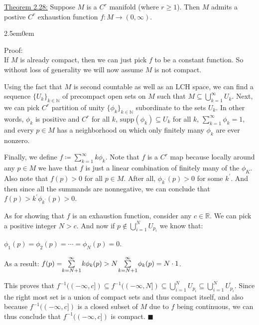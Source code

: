 \documentclass{book}
\newcommand{\exTwo}{%
   \color{Purple}%
   \fontsize{13}{15}\selectfont%
}
\newcommand{\exThreeP}{%
   \color{RedViolet}%
   \fontsize{12}{14}\selectfont%
}
\newenvironment{myIndent}{%
   \begin{adjustwidth}{2.5em}{0em}%
}{%
   \end{adjustwidth}%
}
\newcommand{\supp}{\mathrm{supp}}
\newcommand{\retTwo}{\hfill\bigbreak}
\begin{document}
\exTwo\ul{Theorem 2.28:} Suppose $M$ is a $C^r$ manifold (where $r \geq 1$). Then $M$ admits a postive $C^r$ exhaustion function $f: M \to (0, \infty)$.
\begin{myIndent}\exThreeP
	Proof:\\
	If $M$ is already compact, then we can just pick $f$ to be a constant function. So without loss of generality we will now assume $M$ is not compact.\newpage

	Using the fact that $M$ is second countable as well as an LCH space, we can find a sequence $\{U_k\}_{k \in \mathbb{N}}$ of precompact open sets on $M$ such that $M \subseteq \bigcup_{k=1}^\infty U_k$. Next, we can pick $C^r$ partition of unity $\{\phi_k\}_{k \in \mathbb{N}}$ subordinate to the sets $U_k$. In other words, $\phi_k$ is positive and $C^r$ for all $k$, $\supp(\phi_k) \subseteq U_k$ for all $k$, $\sum_{k=1}^\infty \phi_k = 1$, and every $p \in M$ has a neighborhood on which only finitely many $\phi_k$ are ever nonzero.\retTwo
	
	Finally, we define $f \coloneqq \sum_{k = 1}^\infty k \phi_k$. Note that $f$ is a $C^r$ map because locally around any $p \in M$ we have that $f$ is just a linear combination of finitely many of the $\phi_K$. Also note that $f(p) > 0$ for all $p \in M$. After all, $\phi_{k^\prime}(p) > 0$ for some $k^\prime$. And then since all the summands are nonnegative, we can conclude that $f(p) > k^\prime \phi_{k^\prime}(p) > 0$.\retTwo

	As for showing that $f$ is an exhaustion function, consider any $c \in \mathbb{R}$. We can pick a positive integer $N > c$. And now if $p \notin \bigcup_{i=1}^N U_{p_i}$ we know that:
	
	{\centering$\phi_1(p) =  \phi_2(p) = \cdots = \phi_N(p) = 0$.\\ [4pt]\par}

	As a result: $f(p) =\hspace{-0.3em} \sum\limits_{k = N + 1}^\infty\hspace{-0.1em} k\phi_k(p) > N\hspace{-0.1em} \sum\limits_{k = N + 1}^\infty\hspace{-0.1em} \phi_k(p) = N \cdot 1$.\retTwo
	
	This proves that $f^{-1}((-\infty, c]) \subseteq f^{-1}((-\infty, N]) \subseteq \bigcup_{i=1}^N U_{p_i} \subseteq \bigcup_{i=1}^N \overline{U_{p_i}}$. Since the right most set is a union of compact sets and thus compact itself, and also because $f^{-1}((-\infty, c])$ is a closed subset of $M$ due to $f$ being continuous, we can thus conclude that $f^{-1}((-\infty, c])$ is compact. $\blacksquare$\retTwo
\end{myIndent}
\end{document}
